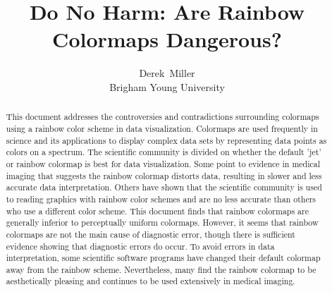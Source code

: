 \documentclass[journal]{IEEEtran}
\title{Do No Harm: Are Rainbow Colormaps Dangerous? \\}
\author{Derek~Miller \\ Brigham Young University}%
\begin{document}
\begin{titlepage}
\maketitle
\thispagestyle{empty}

\begin{abstract}
This document addresses the controversies and contradictions
surrounding colormaps using a rainbow color scheme in data visualization.
Colormaps are used frequently in science and its applications
to display complex data sets by
representing data points as colors on a spectrum. The scientific
community is divided on whether the default 'jet' or rainbow colormap
is best for data visualization. Some point to evidence in medical imaging
that suggests the rainbow colormap distorts data, resulting in slower and 
less accurate data interpretation. Others have shown that the
scientific community is used to reading graphics with rainbow
color schemes and are no less accurate than others who use
a different color scheme. This document finds that rainbow colormaps
are generally inferior to perceptually uniform colormaps. However, it
seems that rainbow colormaps are not the main cause of diagnostic error,
though there is sufficient evidence showing that diagnostic errors do occur.
To avoid errors in data interpretation, some scientific software programs
have changed their default colormap away from the rainbow scheme.
Nevertheless, many find the rainbow colormap to be aesthetically pleasing
and continues to be used extensively in medical imaging.
\end{abstract}
\tableofcontents
\vspace*{\fill}
\end{titlepage}

\IEEEpeerreviewmaketitle
\end{document}
